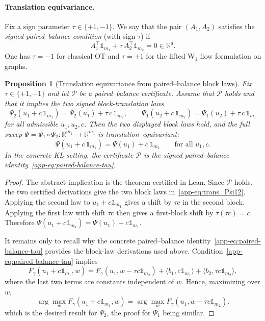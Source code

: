 \documentclass{article}
\newcommand{\dotp}[2]{\langle #1,#2 \rangle}
\theoremstyle{plain}
\newtheorem{proposition}{Proposition}[section]
\newcommand{\ones}{\mathds{1}}
\newcommand{\RR}{\mathbb{R}}
\begin{document}
\paragraph{Translation equivariance.}


Fix a sign parameter $\tau\in\{+1,-1\}$. We say that the pair $(A_1,A_2)$ satisfies the
\emph{signed paired--balance condition} (with sign $\tau$) if
\begin{equation}\label{app-eq:paired-balance-tau}
A_1^\top \ones_{m_1} + \tau\,A_2^\top \ones_{m_2} = 0  \in \RR^d.
\end{equation}
One has $\tau=-1$ for classical OT and $\tau=+1$ for the lifted $\mathrm{W}_1$ flow formulation on graphs.

\begin{proposition}[Translation equivariance from paired--balance block laws]\label{app-prop:translation-equivariance}
Fix $\tau\in\{+1,-1\}$ and let $\mathcal P$ be a paired--balance certificate.  Assume
that $\mathcal P$ holds and that it implies the two signed block-translation laws
\begin{equation}\label{app-eq:trans_Psi12}
\Psi_2(u_1+c\,\ones_{m_1})=\Psi_2(u_1)+\tau\,c\,\ones_{m_2},
\qquad
\Psi_1(u_2+c\,\ones_{m_2})=\Psi_1(u_2)+\tau\,c\,\ones_{m_1}
\end{equation}
for all admissible $u_1,u_2,c$. Then the two displayed block laws hold, and the
full sweep $\Psi=\Psi_1\circ\Psi_2:\RR^{m_1}\to\RR^{m_1}$ is translation--equivariant:
\begin{equation}\label{app-eq:trans_Psi}
\Psi(u_1+c\,\ones_{m_1})=\Psi(u_1)+c\,\ones_{m_1}
\qquad\text{for all }u_1,c.
\end{equation}
In the concrete KL setting, the certificate $\mathcal P$ is the signed paired--balance
identity~\eqref{app-eq:paired-balance-tau}.
\end{proposition}

\begin{proof}
The abstract implication is the theorem certified in Lean. Since $\mathcal P$ holds, the
two certified derivations give the two block laws in~\eqref{app-eq:trans_Psi12}. Applying
the second law to $u_1+c\ones_{m_1}$ gives a shift by $\tau c$ in the second block. Applying
the first law with shift $\tau c$ then gives a first-block shift by $\tau(\tau c)=c$.
Therefore $\Psi(u_1+c\ones_{m_1})=\Psi(u_1)+c\ones_{m_1}$.

It remains only to recall why the concrete paired--balance identity~\eqref{app-eq:paired-balance-tau}
provides the block-law derivations used above. Condition~\eqref{app-eq:paired-balance-tau} implies
\begin{equation}\label{app-eq:argmax_equivariance}
F_\gamma(u_1+c\ones_{m_1},w)=F_\gamma(u_1,w-\tau c\ones_{m_2})+\dotp{b_1}{c\ones_{m_1}}+\dotp{b_2}{\tau c\ones_{m_2}},
\end{equation}
where the last two terms are constants independent of $w$. Hence, maximizing over $w$,
\[
\arg\max_{w} F_\gamma(u_1+c\ones_{m_1},w)
=
\arg\max_{w} F_\gamma(u_1,w-\tau c\ones_{m_2}).
\]
which is the desired result for $\Psi_2$, the proof for $\Psi_1$ being similar. 
\end{proof}
\end{document}

